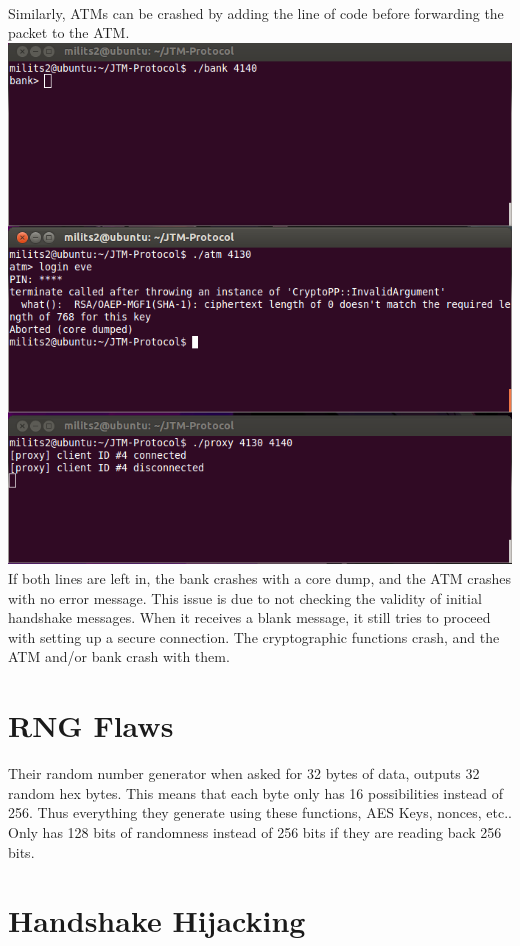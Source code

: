 \documentclass{article}
\begin{document}
\\
Similarly, ATMs can be crashed by adding the line of code before forwarding the packet to the ATM.
\\
\includegraphics[scale=0.5]{crashATM.png}
\\
If both lines are left in, the bank crashes with a core dump, and the ATM crashes with no error message. This issue is due to not checking the validity of initial handshake messages. When it receives a blank message, it still tries to proceed with setting up a secure connection. The cryptographic functions crash, and the ATM and/or bank crash with them.

\section{RNG Flaws}

Their random number generator when asked for 32 bytes of data, outputs 32
random hex bytes. This means that each byte only has 16 possibilities instead
of 256.
Thus everything they generate using these functions, AES Keys, nonces, etc..
Only has 128 bits of randomness instead of 256 bits if they are reading back 256 bits.

\section{Handshake Hijacking}
\end{document}
